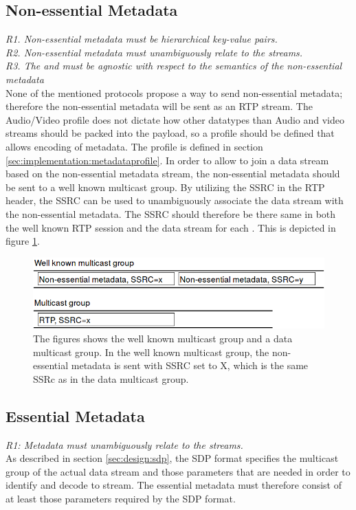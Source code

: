 \subsection{Non-essential Metadata} \label{sec:design:nonessential}
\textit{R1. Non-essential metadata must be hierarchical key-value pairs.} \\
\textit{R2. Non-essential metadata must unambiguously relate to the streams.} \\
\textit{R3. The \pub{} and \sub{} must be agnostic with respect to the semantics of the non-essential metadata} \\
None of the mentioned protocols propose a way to send non-essential metadata; therefore the non-essential metadata will be sent as an RTP stream. The Audio/Video profile does not dictate how other datatypes than Audio and video streams should be packed into the payload, so a profile should be defined that allows encoding of metadata. The profile is defined in section \ref{sec:implementation:metadataprofile}. In order to allow \subs{} to join a data stream based on the non-essential metadata stream, the non-essential metadata should be sent to a well known multicast group. By utilizing the SSRC in the RTP header, the SSRC can be used to unambiguously associate the data stream with the non-essential metadata. The SSRC should therefore be there same in both the well known RTP session and the data stream for each \pub{}. This is depicted in figure \ref{fig:design:nonessential:fig}.

\begin{figure}[H]
	\centering
	\includegraphics[width=\textwidth]{figures/non-essential-ssrc}
	\caption{The figures shows the well known multicast group and a data multicast group. In the well known multicast group, the non-essential metadata is sent with SSRC set to X, which is the same SSRc as in the data multicast group.} \label{fig:design:nonessential:fig}
\end{figure}


\subsection{Essential Metadata} \label{sec:design:essentalmetadata}
\textit{R1: Metadata must unambiguously relate to the streams.}\\
As described in section \ref{sec:design:sdp}, the SDP format specifies the multicast group of the actual data stream and those parameters that are needed in order to identify and decode to stream.
The essential metadata must therefore consist of at least those parameters required by the SDP format.\\

